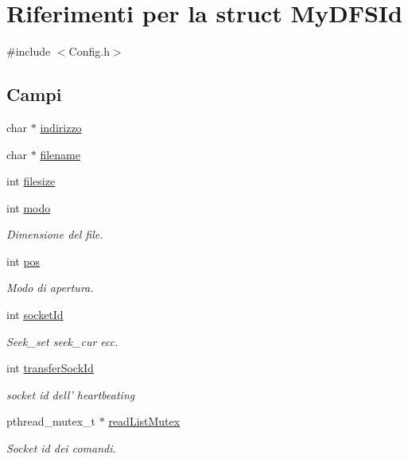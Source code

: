\hypertarget{structMyDFSId}{\section{Riferimenti per la struct My\+D\+F\+S\+Id}
\label{structMyDFSId}
}


{\ttfamily \#include $<$Config.\+h$>$}

\subsection*{Campi}
\begin{DoxyCompactItemize}
\item 
char $\ast$ \hyperlink{structMyDFSId_ac8c10a1a5b18776bf5e5585ee9e26331}{indirizzo}
\item 
char $\ast$ \hyperlink{structMyDFSId_ac0e1b8c96d859982c1a7d49f9e929e48}{filename}
\item 
int \hyperlink{structMyDFSId_a2b7cf19c5ac22e03ae8abf7e688fee2a}{filesize}
\item 
int \hyperlink{structMyDFSId_a98bc5ce1a7734459d8b81c997da4e9f0}{modo}
\begin{DoxyCompactList}\small\item\em Dimensione del file. \end{DoxyCompactList}\item 
int \hyperlink{structMyDFSId_aaeac229fb85c313f91a76f00be916832}{pos}
\begin{DoxyCompactList}\small\item\em Modo di apertura. \end{DoxyCompactList}\item 
int \hyperlink{structMyDFSId_a382a74f109962751085cea7aac2892cc}{socket\+Id}
\begin{DoxyCompactList}\small\item\em Seek\+\_\+set seek\+\_\+cur ecc. \end{DoxyCompactList}\item 
int \hyperlink{structMyDFSId_a3b62a6d0f52a871bda4bf9cd56c57ff7}{transfer\+Sock\+Id}
\begin{DoxyCompactList}\small\item\em socket id dell' heartbeating \end{DoxyCompactList}\item 
pthread\+\_\+mutex\+\_\+t $\ast$ \hyperlink{structMyDFSId_a71f51c82d7133bfc16fcffeb4c395da0}{read\+List\+Mutex}
\begin{DoxyCompactList}\small\item\em Socket id dei comandi. \end{DoxyCompactList}\item 

\end{DoxyCompactItemize}
